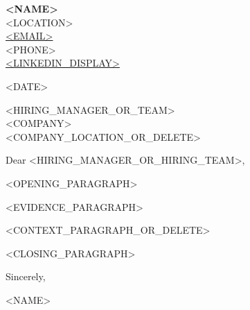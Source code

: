 \documentclass[11pt]{article}          %
\begin{document}
\begin{flushright}
    \textbf{<NAME>} \\
    <LOCATION> \\
    \href{mailto:<EMAIL>}{<EMAIL>} \\
    <PHONE> \\
    \href{<LINKEDIN_URL>}{<LINKEDIN_DISPLAY>}
\end{flushright}

<DATE>

<HIRING_MANAGER_OR_TEAM> \\
<COMPANY> \\
<COMPANY_LOCATION_OR_DELETE>

\vspace{0.5em}

Dear <HIRING_MANAGER_OR_HIRING_TEAM>,

<OPENING_PARAGRAPH>

<EVIDENCE_PARAGRAPH>

<CONTEXT_PARAGRAPH_OR_DELETE>

<CLOSING_PARAGRAPH>

Sincerely,

\vspace{1.5em}
<NAME>
\end{document}
